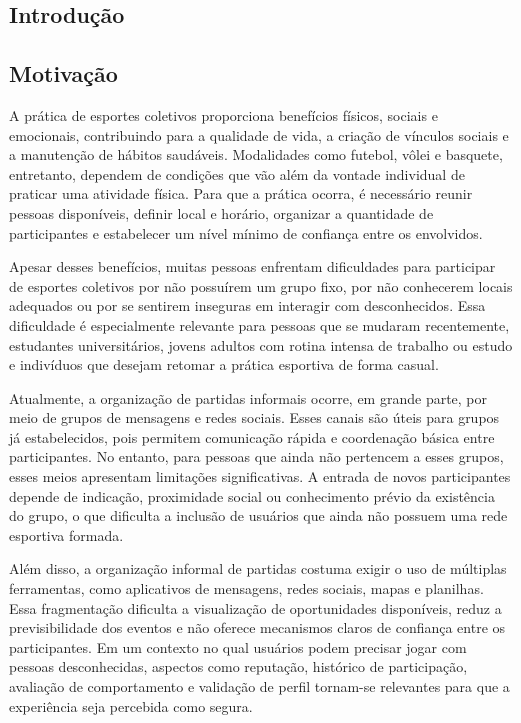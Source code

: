 \documentclass[a4paper, 12pt]{article}
\begin{document}
\begin{justify}
\setcounter{page}{1}

\section{Introdução}

\subsection{Motivação}

A prática de esportes coletivos proporciona benefícios físicos, sociais e emocionais, contribuindo para a qualidade de vida, a criação de vínculos sociais e a manutenção de hábitos saudáveis. Modalidades como futebol, vôlei e basquete, entretanto, dependem de condições que vão além da vontade individual de praticar uma atividade física. Para que a prática ocorra, é necessário reunir pessoas disponíveis, definir local e horário, organizar a quantidade de participantes e estabelecer um nível mínimo de confiança entre os envolvidos.

Apesar desses benefícios, muitas pessoas enfrentam dificuldades para participar de esportes coletivos por não possuírem um grupo fixo, por não conhecerem locais adequados ou por se sentirem inseguras em interagir com desconhecidos. Essa dificuldade é especialmente relevante para pessoas que se mudaram recentemente, estudantes universitários, jovens adultos com rotina intensa de trabalho ou estudo e indivíduos que desejam retomar a prática esportiva de forma casual.

Atualmente, a organização de partidas informais ocorre, em grande parte, por meio de grupos de mensagens e redes sociais. Esses canais são úteis para grupos já estabelecidos, pois permitem comunicação rápida e coordenação básica entre participantes. No entanto, para pessoas que ainda não pertencem a esses grupos, esses meios apresentam limitações significativas. A entrada de novos participantes depende de indicação, proximidade social ou conhecimento prévio da existência do grupo, o que dificulta a inclusão de usuários que ainda não possuem uma rede esportiva formada.

Além disso, a organização informal de partidas costuma exigir o uso de múltiplas ferramentas, como aplicativos de mensagens, redes sociais, mapas e planilhas. Essa fragmentação dificulta a visualização de oportunidades disponíveis, reduz a previsibilidade dos eventos e não oferece mecanismos claros de confiança entre os participantes. Em um contexto no qual usuários podem precisar jogar com pessoas desconhecidas, aspectos como reputação, histórico de participação, avaliação de comportamento e validação de perfil tornam-se relevantes para que a experiência seja percebida como segura.


\end{justify}
\end{document}
